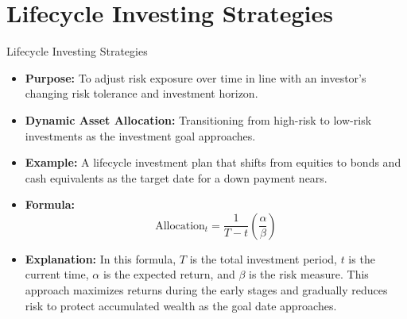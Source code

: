 \documentclass{beamer}
\begin{document}
\section{Lifecycle Investing Strategies}
\begin{frame}{Lifecycle Investing Strategies}
    \begin{itemize}
        \item \textbf{Purpose:} To adjust risk exposure over time in line with an investor's changing risk tolerance and investment horizon.
        \item \textbf{Dynamic Asset Allocation:} Transitioning from high-risk to low-risk investments as the investment goal approaches.
        \item \textbf{Example:} A lifecycle investment plan that shifts from equities to bonds and cash equivalents as the target date for a down payment nears.
        \item \textbf{Formula:}
        \begin{equation*}
            \text{Allocation}_t = \frac{1}{T-t} \left( \frac{\alpha}{\beta} \right)
        \end{equation*}
        \item \textbf{Explanation:} In this formula, \( T \) is the total investment period, \( t \) is the current time, \( \alpha \) is the expected return, and \( \beta \) is the risk measure. This approach maximizes returns during the early stages and gradually reduces risk to protect accumulated wealth as the goal date approaches.
    \end{itemize}
\end{frame}
\end{document}

